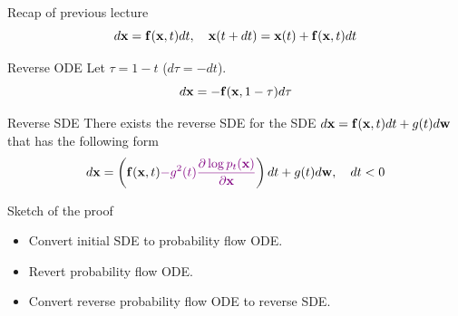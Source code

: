 \begin{frame}{Recap of previous lecture}
	\vspace{-0.3cm}
	\[
		d\mathbf{x} = \mathbf{f}(\mathbf{x}, t) dt, \quad \mathbf{x}(t + dt) = \mathbf{x}(t) + \mathbf{f}(\mathbf{x}, t) dt
	\]
	\vspace{-0.5cm}
	\begin{block}{Reverse ODE}
		Let $\tau = 1 - t$ ($d\tau = -dt$).
		\vspace{-0.3cm}
		\[
			d\mathbf{x} = - \mathbf{f}(\mathbf{x}, 1 - \tau) d \tau
		\]
	\end{block}
	\vspace{-0.5cm}
	\begin{block}{Reverse SDE}
		There exists the reverse SDE for the SDE $d\mathbf{x} = \mathbf{f}(\mathbf{x}, t) dt + g(t) d \mathbf{w}$ that has the following form
		\vspace{-0.3cm}
		\[
			d\mathbf{x} = \left(\mathbf{f}(\mathbf{x}, t) {\color{violet}- g^2(t) \frac{\partial \log p_t(\mathbf{x})}{\partial \mathbf{x}}}\right) dt + g(t) d \mathbf{w}, \quad dt < 0
		\] 
	\end{block}
	\vspace{-0.5cm}
	\begin{block}{Sketch of the proof}
		\begin{itemize}
			\item Convert initial SDE to probability flow ODE.
			\item Revert probability flow ODE.
			\item Convert reverse probability flow ODE to reverse SDE.
		\end{itemize}
	\end{block}
\end{frame}
